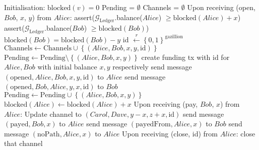 \begin{algorithm}
  \caption{$\mathcal{F}_{\mathrm{PayNet}}$}
  \label{alg:payfunc}
  \begin{algorithmic}[1]
    \State Initialisation:
      $\mathrm{blocked}\left(v\right) = 0$
    \EndFor
    \State Pending = $\emptyset$
    \State Channels = $\emptyset$
    \State
    \State Upon receiving (open, $Bob$, $x$, $y$) from $Alice$:
        \State assert($\mathcal{G}_{\mathrm{Ledger}}$.balance($Alice$) $\geq
        \mathrm{blocked}\left(Alice\right) + x$)
        \State assert($\mathcal{G}_{\mathrm{Ledger}}$.balance($Bob$) $\geq
        \mathrm{blocked}\left(Bob\right)$)
        \State $\mathrm{blocked}\left(Bob\right) = \mathrm{blocked}\left(Bob\right) - y$
        \State id $\overset{r}{\leftarrow} \left\{0, 1\right\}^{\mathrm{gazillion}}$
        \State $\mathrm{Channels} \leftarrow \mathrm{Channels} \cup \left\{\left(Alice,
        Bob, x, y, \mathrm{id}\right)\right\}$
        \State $\mathrm{Pending} \leftarrow \mathrm{Pending} \setminus \left\{\left(Alice,
        Bob, x, y\right)\right\}$
        \State create funding tx with id for $Alice, Bob$ with initial balance $x, y$
        respectively
        \State send message $\left(\mathrm{opened}, Alice, Bob, x, y, \mathrm{id}\right)$
        to $Alice$
        \State send message $\left(\mathrm{opened}, Bob, Alice, y, x, \mathrm{id}\right)$
        to $Bob$
      \Else
        \State $\mathrm{Pending} \leftarrow \mathrm{Pending} \cup \left\{\left(Alice, Bob,
        x, y\right)\right\}$
        \State $\mathrm{blocked}\left(Alice\right) \leftarrow
        \mathrm{blocked}\left(Alice\right) + x$ 
      \EndIf
    \State
    \State Upon receiving (pay, $Bob$, $x$) from $Alice$: 
          \State Update channel to $\left(Carol, Dave, y - x, z + x, \mathrm{id}\right)$
        \EndFor
        \State send message $\left(\mathrm{payed}, Bob, x\right)$ to $Alice$
        \State send message $\left(\mathrm{payedFrom}, Alice, x\right)$ to $Bob$
      \Else
        \State send message $\left(\mathrm{noPath}, Alice, x\right)$ to $Alice$
      \EndIf
    \State
    \State Upon receiving (close, id) from $Alice$: 
        close that channel
      \EndIf
  \end{algorithmic}
\end{algorithm}
